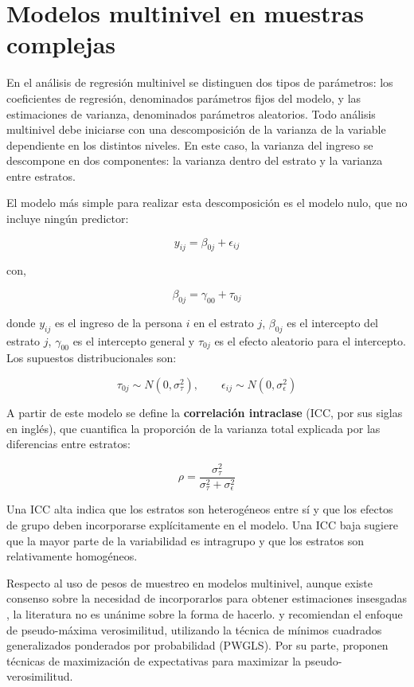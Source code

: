 \documentclass[
  spanish,
  12pt,
]{book}
\begin{document}
\section{Modelos multinivel en muestras complejas}\label{sec-multinivel-muestras-complejas}

En el análisis de regresión multinivel se distinguen dos tipos de parámetros: los coeficientes de regresión, denominados parámetros fijos del modelo, y las estimaciones de varianza, denominados parámetros aleatorios. Todo análisis multinivel debe iniciarse con una descomposición de la varianza de la variable dependiente en los distintos niveles. En este caso, la varianza del ingreso se descompone en dos componentes: la varianza dentro del estrato y la varianza entre estratos.

El modelo más simple para realizar esta descomposición es el modelo nulo, que no incluye ningún predictor:

\[
y_{ij} = \beta_{0j} + \epsilon_{ij}
\]

con,

\[
\beta_{0j} = \gamma_{00} + \tau_{0j}
\]

donde \(y_{ij}\) es el ingreso de la persona \(i\) en el estrato \(j\), \(\beta_{0j}\) es el intercepto del estrato \(j\), \(\gamma_{00}\) es el intercepto general y \(\tau_{0j}\) es el efecto aleatorio para el intercepto. Los supuestos distribucionales son:

\[
\tau_{0j} \sim N\left(0, \sigma_{\tau}^{2}\right), \qquad \epsilon_{ij} \sim N\left(0, \sigma_{\epsilon}^{2}\right)
\]

A partir de este modelo se define la \textbf{correlación intraclase} (ICC, por sus siglas en inglés), que cuantifica la proporción de la varianza total explicada por las diferencias entre estratos:

\[
\rho = \frac{\sigma_{\tau}^{2}}{\sigma_{\tau}^{2} + \sigma_{\epsilon}^{2}}
\]

Una ICC alta indica que los estratos son heterogéneos entre sí y que los efectos de grupo deben incorporarse explícitamente en el modelo. Una ICC baja sugiere que la mayor parte de la variabilidad es intragrupo y que los estratos son relativamente homogéneos.

Respecto al uso de pesos de muestreo en modelos multinivel, aunque existe consenso sobre la necesidad de incorporarlos para obtener estimaciones insesgadas \citep{cai2013investigation}, la literatura no es unánime sobre la forma de hacerlo. \citet{pfeffermann1998weighting} y \citet{asparouhov2006general} recomiendan el enfoque de pseudo-máxima verosimilitud, utilizando la técnica de mínimos cuadrados generalizados ponderados por probabilidad (PWGLS). Por su parte, \citet{rabehesketh2006multilevel} proponen técnicas de maximización de expectativas para maximizar la pseudo-verosimilitud.
\end{document}
